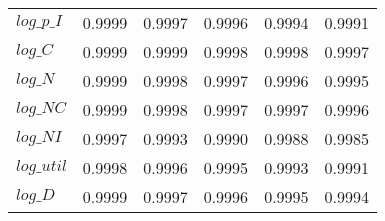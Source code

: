 \begin{center}
\begin{longtable}{lccccc}
$log\_p\_I  $	 & 	     0.9999	 & 	     0.9997	 & 	     0.9996	 & 	     0.9994	 & 	     0.9991 \\ 
$log\_C     $	 & 	     0.9999	 & 	     0.9999	 & 	     0.9998	 & 	     0.9998	 & 	     0.9997 \\ 
$log\_N     $	 & 	     0.9999	 & 	     0.9998	 & 	     0.9997	 & 	     0.9996	 & 	     0.9995 \\ 
$log\_NC    $	 & 	     0.9999	 & 	     0.9998	 & 	     0.9997	 & 	     0.9997	 & 	     0.9996 \\ 
$log\_NI    $	 & 	     0.9997	 & 	     0.9993	 & 	     0.9990	 & 	     0.9988	 & 	     0.9985 \\ 
$log\_util  $	 & 	     0.9998	 & 	     0.9996	 & 	     0.9995	 & 	     0.9993	 & 	     0.9991 \\ 
$log\_D     $	 & 	     0.9999	 & 	     0.9997	 & 	     0.9996	 & 	     0.9995	 & 	     0.9994 \\ 
\end{longtable}
 \end{center}
